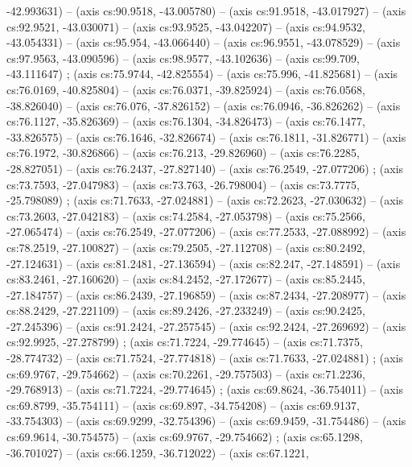   -42.993631) -- (axis cs:90.9518, -43.005780) -- (axis cs:91.9518,
  -43.017927) -- (axis cs:92.9521, -43.030071) -- (axis cs:93.9525,
  -43.042207) -- (axis cs:94.9532, -43.054331) -- (axis cs:95.954, -43.066440)
  -- (axis cs:96.9551, -43.078529) -- (axis cs:97.9563, -43.090596) -- (axis
  cs:98.9577, -43.102636) -- (axis cs:99.709, -43.111647)
  ;  (axis cs:75.9744, -42.825554) -- (axis
  cs:75.996, -41.825681) -- (axis cs:76.0169, -40.825804) -- (axis cs:76.0371,
  -39.825924) -- (axis cs:76.0568, -38.826040) -- (axis cs:76.076, -37.826152)
  -- (axis cs:76.0946, -36.826262) -- (axis cs:76.1127, -35.826369) -- (axis
  cs:76.1304, -34.826473) -- (axis cs:76.1477, -33.826575) -- (axis
  cs:76.1646, -32.826674) -- (axis cs:76.1811, -31.826771) -- (axis
  cs:76.1972, -30.826866) -- (axis cs:76.213, -29.826960) -- (axis cs:76.2285,
  -28.827051) -- (axis cs:76.2437, -27.827140) -- (axis cs:76.2549,
  -27.077206) ;  (axis cs:73.7593, -27.047983) --
  (axis cs:73.763, -26.798004) -- (axis cs:73.7775, -25.798089)
  ;  (axis cs:71.7633, -27.024881) -- (axis
  cs:72.2623, -27.030632) -- (axis cs:73.2603, -27.042183) -- (axis
  cs:74.2584, -27.053798) -- (axis cs:75.2566, -27.065474) -- (axis
  cs:76.2549, -27.077206) -- (axis cs:77.2533, -27.088992) -- (axis
  cs:78.2519, -27.100827) -- (axis cs:79.2505, -27.112708) -- (axis
  cs:80.2492, -27.124631) -- (axis cs:81.2481, -27.136594) -- (axis cs:82.247,
  -27.148591) -- (axis cs:83.2461, -27.160620) -- (axis cs:84.2452,
  -27.172677) -- (axis cs:85.2445, -27.184757) -- (axis cs:86.2439,
  -27.196859) -- (axis cs:87.2434, -27.208977) -- (axis cs:88.2429,
  -27.221109) -- (axis cs:89.2426, -27.233249) -- (axis cs:90.2425,
  -27.245396) -- (axis cs:91.2424, -27.257545) -- (axis cs:92.2424,
  -27.269692) -- (axis cs:92.9925, -27.278799) ; 
  (axis cs:71.7224, -29.774645) -- (axis cs:71.7375, -28.774732) -- (axis
  cs:71.7524, -27.774818) -- (axis cs:71.7633, -27.024881)
  ;  (axis cs:69.9767, -29.754662) -- (axis
  cs:70.2261, -29.757503) -- (axis cs:71.2236, -29.768913) -- (axis
  cs:71.7224, -29.774645) ;  (axis cs:69.8624,
  -36.754011) -- (axis cs:69.8799, -35.754111) -- (axis cs:69.897, -34.754208)
  -- (axis cs:69.9137, -33.754303) -- (axis cs:69.9299, -32.754396) -- (axis
  cs:69.9459, -31.754486) -- (axis cs:69.9614, -30.754575) -- (axis
  cs:69.9767, -29.754662) ;  (axis cs:65.1298,
  -36.701027) -- (axis cs:66.1259, -36.712022) -- (axis cs:67.1221,
